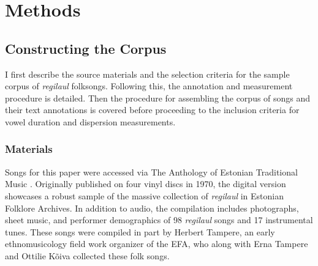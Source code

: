 \chapter{Methods}
%


\section{Constructing the Corpus}

I first describe the source materials and the selection criteria for the sample corpus of {\it regilaul} folksongs. Following this, the annotation and measurement procedure is detailed. Then the procedure for assembling the corpus of songs and their text annotations is covered before proceeding to the inclusion criteria for vowel duration and dispersion measurements.

\subsection{Materials}



%
%




Songs for this paper were accessed via The Anthology of Estonian Traditional Music \citep{tampere2016}. Originally published on four vinyl discs in 1970, the digital version showcases a robust sample of the massive collection of {\it regilaul} in Estonian Folklore Archives. In addition to audio, the  compilation includes  photographs, sheet music, and performer demographics of 98 {\it regilaul} songs and 17 instrumental tunes. 
These songs were compiled in part by Herbert Tampere, an early ethnomusicology field work organizer of the EFA, who along with Erna Tampere and Ottilie Kõiva collected these folk songs\citep{oras2002, tampere2016}. 

